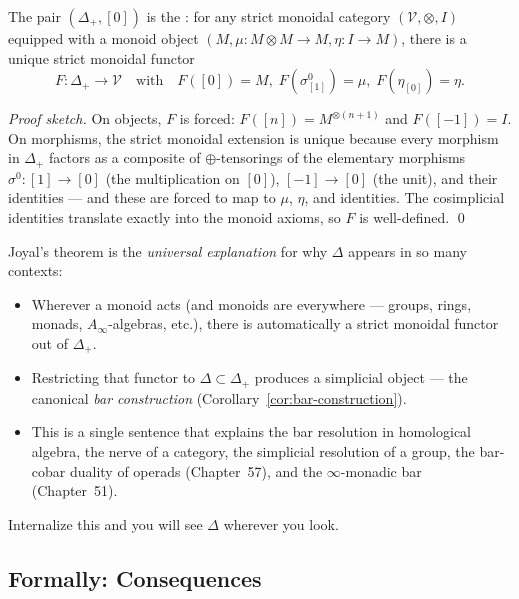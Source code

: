 \begin{theorem}
\label{thm:joyal-universal}
The pair $(\Delta_+, [0])$ is the : for any strict monoidal category $(\mathcal{V},
\otimes, I)$ equipped with a monoid object $(M, \mu : M \otimes M \to M,
\eta : I \to M)$, there is a unique strict monoidal functor
\begin{equation*}
  F : \Delta_+ \to \mathcal{V} \quad \text{with} \quad F([0]) = M, \;
  F(\sigma^0_{[1]}) = \mu, \; F(\eta_{[0]}) = \eta.
\end{equation*}
\end{theorem}

\begin{proof}[Proof sketch]
On objects, $F$ is forced: $F([n]) = M^{\otimes (n+1)}$ and $F([-1]) = I$.
On morphisms, the strict monoidal extension is unique because every
morphism in $\Delta_+$ factors as a composite of $\oplus$-tensorings of
the elementary morphisms $\sigma^0 : [1] \to [0]$ (the multiplication on
$[0]$), $[-1] \to [0]$ (the unit), and their identities — and these are
forced to map to $\mu$, $\eta$, and identities. The cosimplicial
identities translate exactly into the monoid axioms, so $F$ is
well-defined.
\qed
\end{proof}

\begin{readernote}
Joyal's theorem is the \emph{universal explanation} for why $\Delta$
appears in so many contexts:
\begin{itemize}
  \item Wherever a monoid acts (and monoids are everywhere — groups,
        rings, monads, $A_\infty$-algebras, etc.), there is automatically
        a strict monoidal functor out of $\Delta_+$.
  \item Restricting that functor to $\Delta \subset \Delta_+$ produces a
        simplicial object — the canonical \emph{bar construction}
        (Corollary~\ref{cor:bar-construction}).
  \item This is a single sentence that explains the bar resolution in
        homological algebra, the nerve of a category, the simplicial
        resolution of a group, the bar-cobar duality of operads (Chapter~57),
        and the $\infty$-monadic bar (Chapter~51).
\end{itemize}
Internalize this and you will see $\Delta$ wherever you look.
\end{readernote}

\subsection{Formally: Consequences}

